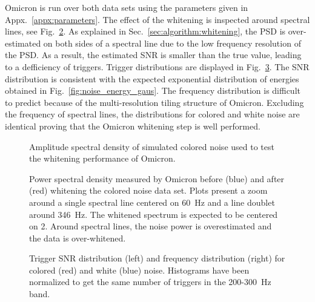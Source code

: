 Omicron is run over both data sets using the parameters given in Appx.~\ref{appx:parameters}. The effect of the whitening is inspected around spectral lines, see Fig.~\ref{fig:char_cw_line}.  As explained in Sec.~\ref{sec:algorithm:whitening}, the PSD is over-estimated on both sides of a spectral line due to the low frequency resolution of the PSD. As a result, the estimated SNR is smaller than the true value, leading to a defficiency of triggers. Trigger distributions are displayed in Fig.~\ref{fig:char_cw}. The SNR distribution is consistent with the expected exponential distribution of energies obtained in Fig.~\ref{fig:noise_energy_gaus}. The frequency distribution is difficult to predict because of the multi-resolution tiling structure of Omicron. Excluding the frequency of spectral lines, the distributions for colored and white noise are identical proving that the Omicron whitening step is well performed.
\begin{figure}
  \center
  \caption{Amplitude spectral density of simulated colored noise used to test the whitening performance of Omicron.}
  \label{fig:noise_asd}
\end{figure}
\begin{figure}
  \center
  \caption{Power spectral density measured by Omicron before (blue) and after (red) whitening the colored noise data set. Plots present a zoom around a single spectral line centered on 60~Hz and a line doublet around 346~Hz. The whitened spectrum is expected to be centered on 2. Around spectral lines, the noise power is overestimated and the data is over-whitened.}
  \label{fig:char_cw_line}
\end{figure}
\begin{figure}
  \center
  \caption{Trigger SNR distribution (left) and frequency distribution (right) for colored (red) and white (blue) noise. Histograms have been normalized to get the same number of triggers in the 200-300~Hz band.}
  \label{fig:char_cw}
\end{figure}


